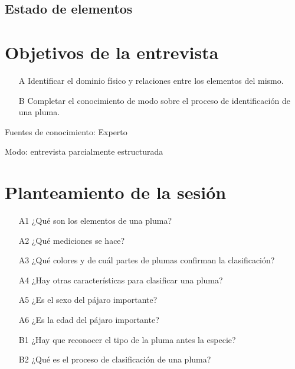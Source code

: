 \documentclass[a4paper,12pt]{article}
\begin{document}
\subsection{Estado de elementos}

\section{Objetivos de la entrevista}
\begin{itemize}
	\item[A] Identificar el dominio físico y relaciones entre los elementos del mismo.
	\item[B] Completar el conocimiento de modo sobre el proceso de identificación de una pluma.
\end{itemize}

Fuentes de conocimiento: Experto

Modo: entrevista parcialmente estructurada

\section{Planteamiento de la sesión}
\begin{itemize}
	\item[A1] ¿Qué son los elementos de una pluma?
	\item[A2] ¿Qué mediciones se hace?
	\item[A3] ¿Qué colores y de cuál partes de plumas confirman la clasificación?
	\item[A4] ¿Hay otras características para clasificar una pluma?
	\item[A5] ¿Es el sexo del pájaro importante?
	\item[A6] ¿Es la edad del pájaro importante?
	\item[B1] ¿Hay que reconocer el tipo de la pluma antes la especie?
	\item[B2] ¿Qué es el proceso de clasificación de una pluma?
\end{itemize}
\end{document}
